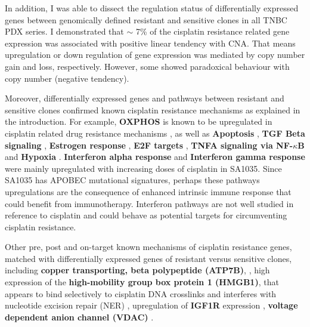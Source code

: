 In addition, I was able to dissect the regulation status of differentially expressed genes between genomically defined resistant and sensitive clones in all TNBC PDX series. 
I demonstrated that $\sim$ 7\% of the cisplatin resistance related gene expression was associated with positive linear tendency with CNA. That means upregulation or down regulation of gene expression was mediated by copy number gain and loss, respectively. However, some 
showed paradoxical behaviour with copy number (negative tendency). 

Moreover, differentially expressed genes and pathways between resistant and sensitive clones confirmed known cisplatin resistance mechanisms as explained in the introduction. For example, \textbf{OXPHOS} is known to be upregulated in cisplatin related drug resistance mechanisms \cite{lee2017myc}, as well as \textbf{Apoptosis} \cite{panaretakis2012cisplatin}, \textbf{TGF Beta signaling} \cite{zhang2019tgfbeta1}, \textbf{Estrogen response} \cite{zhu2018er}, \textbf{E2F targets} \cite{zheng2020upregulation}, \textbf{TNFA signaling via NF-$\kappa$B} \cite{lagunas2008nuclear,ito2015down, ryan2019targeting} and \textbf{Hypoxia} \cite{lee2012hypoxia, mcevoy2015identifying, deben2018hypoxia,li2019erk}.
 \textbf{Interferon alpha response} \cite{provance2019deciphering} and \textbf{Interferon gamma response} \cite{mojic2018dark} were mainly upregulated with increasing doses of cisplatin in SA1035. Since SA1035 has APOBEC mutational signatures, perhaps these pathways upregulations are the consequence of enhanced intrinsic immune response that could benefit from immunotherapy. Interferon pathways are not well studied in reference to cisplatin and could behave as potential targets for circumventing cisplatin resistance.
 
 Other pre, post and on-target known mechanisms of cisplatin resistance genes, matched with differentially expressed genes of resistant versus sensitive clones, including \textbf{copper transporting, beta polypeptide (ATP7B)}, \cite{katano2002acquisition,komatsu2000copper, aida2005expression}, high expression of the \textbf{high-mobility group box protein 1 (HMGB1)}, that appears to bind selectively to cisplatin DNA crosslinks and interferes with nucleotide excision repair (NER) \cite{awuah2017repair, mukherjee2019targeting}, upregulation of \textbf{IGF1R} expression  
 \cite{selfe2018igf1r}, \textbf{voltage dependent anion channel (VDAC)} \cite{yang2006cisplatin}. 
 
